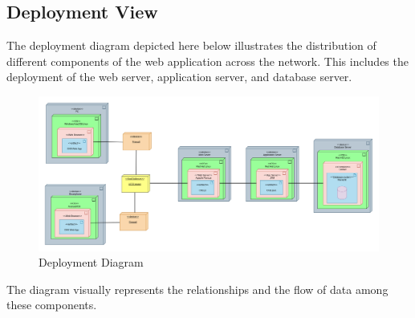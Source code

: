 \documentclass[../DD.tex]{subfiles}
\begin{document}
    \subsection{Deployment View}\label{subsec:deployment_view}
    The deployment diagram depicted here below illustrates the distribution of different components of the web application across the network. 
    This includes the deployment of the web server, application server, and database server.
    \begin{figure}[H]
        \centering
        \includegraphics[width=\textwidth]{../assets/section_2/deployment_diagram.png}
        \caption{Deployment Diagram}
        \label{fig:deployment_diagram}
    \end{figure} 
    The diagram visually represents the relationships and the flow of data among these components.
\end{document}
